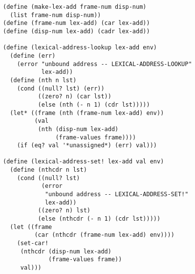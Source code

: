 \documentclass[a4paper,12pt]{article}
\begin{document}
\begin{lstlisting}
(define (make-lex-add frame-num disp-num)
  (list frame-num disp-num))
(define (frame-num lex-add) (car lex-add))
(define (disp-num lex-add) (cadr lex-add))

(define (lexical-address-lookup lex-add env)
  (define (err)
    (error "unbound address -- LEXICAL-ADDRESS-LOOKUP"
           lex-add))
  (define (nth n lst)
    (cond ((null? lst) (err))
          ((zero? n) (car lst))
          (else (nth (- n 1) (cdr lst)))))
  (let* ((frame (nth (frame-num lex-add) env))
         (val
          (nth (disp-num lex-add)
               (frame-values frame))))
    (if (eq? val '*unassigned*) (err) val)))

(define (lexical-address-set! lex-add val env)
  (define (nthcdr n lst)
    (cond ((null? lst)
           (error
            "unbound address -- LEXICAL-ADDRESS-SET!"
            lex-add))
          ((zero? n) lst)
          (else (nthcdr (- n 1) (cdr lst)))))
  (let ((frame
         (car (nthcdr (frame-num lex-add) env))))
    (set-car!
     (nthcdr (disp-num lex-add)
             (frame-values frame))
     val)))
\end{lstlisting}
\end{document}
